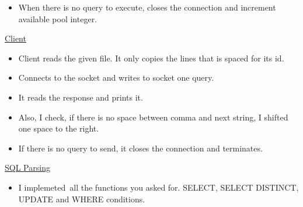 \documentclass[12pt]{article}
\renewcommand{\_}{\kern-1.5pt\textunderscore\kern-1.5pt}
\begin{document}
\vspace{\baselineskip}
\begin{itemize}
	\item When there is no query to execute, closes the connection and increment available pool integer.
\end{itemize}

\vspace{\baselineskip}
\setlength{\parskip}{8.04pt}
\begin{justify}
{\fontsize{16pt}{19.2pt}\selectfont \uline{Client}}
\end{justify}
\begin{itemize}
	\item Client reads the given file. It only copies the lines that is spaced for its id.
	\item Connects to the socket and writes to socket one query.
	\item It reads the response and prints it.
	\item Also, I check, if there is no space between comma and next string, I shifted one space to the right.
	\item If there is no query to send, it closes the connection and terminates.
\end{itemize}

\vspace{\baselineskip}

\vspace{\baselineskip}

\vspace{\baselineskip}

\newpage
\vspace{\baselineskip}
\begin{justify}
{\fontsize{16pt}{19.2pt}\selectfont \uline{SQL Parsing}}
\end{justify}
\begin{itemize}
	\item I implemeted\ all the functions you asked for. SELECT, SELECT DISTINCT, UPDATE and  WHERE conditions.
\end{itemize}
\end{document}
